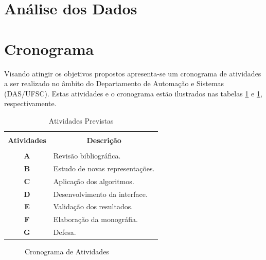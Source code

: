 \section{Análise dos Dados}


\section{Cronograma}
Visando atingir os objetivos propostos apresenta-se um cronograma
de atividades a ser realizado no âmbito do Departamento de
Automação e Sistemas (DAS/UFSC). Estas atividades e o cronograma
estão ilustrados nas tabelas \ref{tb:atividades} e
\ref{fig:cronograma}, respectivamente.


\begin{table}[!htb]
  \centering
  \caption{Atividades Previstas}\label{tb:atividades}
  \begin{tabular}{cp{12cm}}
    \hline \hline &\\[-0.4cm]
    {\bf Atividades} & \multicolumn{1}{c}{\bf Descrição} \\
    \hline
    &\\[-0.4cm]
    \textbf{A} & Revisão bibliográfica. \\[0.2cm]
    \textbf{B} &  Estudo de novas representações.\\[0.2cm]
    \textbf{C} &  Aplicação dos algoritmos.\\[0.2cm]
    \textbf{D} &  Desenvolvimento da interface. \\[0.2cm]
    \textbf{E} &  Validação dos resultados.\\[0.2cm]
    \textbf{F} &  Elaboração da monográfia.\\[0.2cm]
    \textbf{G} &  Defesa.\\[0.2cm]
    \hline \hline
  \end{tabular}
\end{table}


\begin{figure}

  \begin{gantt}{10}{12}
    \begin{ganttitle}
    \end{ganttitle}
  \end{gantt}
\caption{Cronograma de Atividades}\label{fig:cronograma}
\end{figure}
